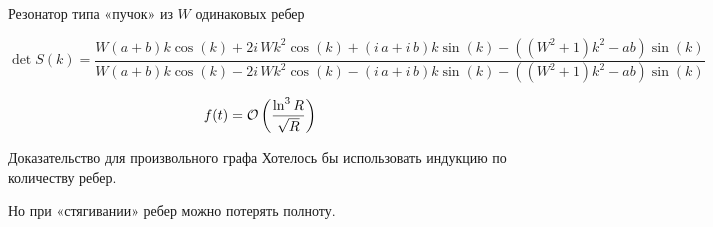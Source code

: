 \documentclass{beamer}
\begin{document}
\begin{frame}{Резонатор типа «пучок» из $W$ одинаковых ребер}

{
\scriptsize
\[
\det S(k) = \frac{W {\left(a + b\right)} k \cos\left(k\right) + 2 i \, W k^{2} \cos\left(k\right) + {\left(i \, a + i \, b\right)} k \sin\left(k\right) - {\left({\left(W^{2} + 1\right)} k^{2} - a b\right)} \sin\left(k\right)}{W {\left(a + b\right)} k \cos\left(k\right) - 2 i \, W k^{2} \cos\left(k\right) - {\left(i \, a + i \, b\right)} k \sin\left(k\right) - {\left({\left(W^{2} + 1\right)} k^{2} - a b\right)} \sin\left(k\right)}
\]
}

\[
f(t) =  \mathcal{O}\left( \frac{\ln^3 R}{\sqrt{R}} \right)
\]
\end{frame}









\begin{frame}{Доказательство для произвольного графа}
Хотелось бы использовать индукцию по количеству ребер.

Но при «стягивании» ребер можно потерять полноту. %
\end{frame}
\end{document}
